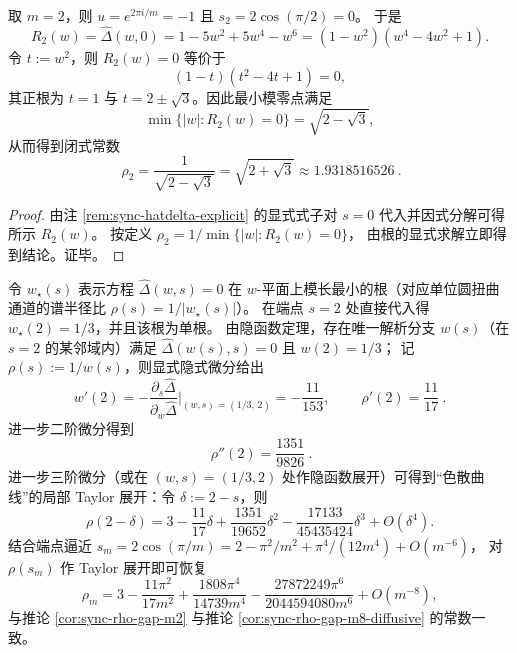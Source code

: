 \begin{corollary}[最坏扭曲 \(m=2\) 的闭式谱半径]\label{cor:sync-rho-m2-closed-form}
取 \(m=2\)，则 \(u=e^{2\pi i/m}=-1\) 且
\(
s_2=2\cos(\pi/2)=0
\)。
于是
\[
R_2(w)=\widehat\Delta(w,0)=1-5w^2+5w^4-w^6=(1-w^2)(w^4-4w^2+1).
\]
令 \(t:=w^2\)，则 \(R_2(w)=0\) 等价于
\[
(1-t)(t^2-4t+1)=0,
\]
其正根为 \(t=1\) 与 \(t=2\pm\sqrt3\)。因此最小模零点满足
\[
\min\{|w|:R_2(w)=0\}=\sqrt{2-\sqrt3},
\]
从而得到闭式常数
\[
\boxed{\ \rho_2=\frac{1}{\sqrt{2-\sqrt3}}=\sqrt{2+\sqrt3}\approx 1.9318516526\ }.
\]
\end{corollary}
\begin{proof}
由注 \ref{rem:sync-hatdelta-explicit} 的显式式子对 \(s=0\) 代入并因式分解可得所示 \(R_2(w)\)。
按定义
\(
\rho_2=1/\min\{|w|:R_2(w)=0\}
\)，
由根的显式求解立即得到结论。证毕。
\end{proof}

\begin{remark}[端点导数指纹：\texorpdfstring{$\rho'(2)=11/17$}{rho'(2)=11/17}]\label{rem:sync-rho-derivative-fingerprint}
令 \(w_\star(s)\) 表示方程 \(\widehat\Delta(w,s)=0\) 在 \(w\)-平面上模长最小的根（对应单位圆扭曲通道的谱半径比 \(\rho(s)=1/|w_\star(s)|\)）。
在端点 \(s=2\) 处直接代入得 \(w_\star(2)=1/3\)，并且该根为单根。
由隐函数定理，存在唯一解析分支 \(w(s)\)（在 \(s=2\) 的某邻域内）满足
\(\widehat\Delta(w(s),s)=0\) 且 \(w(2)=1/3\)；
记 \(\rho(s):=1/w(s)\)，则显式隐式微分给出
\[
w'(2)=-\frac{\partial_s\widehat\Delta}{\partial_w\widehat\Delta}\Big|_{(w,s)=(1/3,\,2)}=-\frac{11}{153},
\qquad
\boxed{\ \rho'(2)=\frac{11}{17}\ }.
\]
进一步二阶微分得到
\[
\boxed{\ \rho''(2)=\frac{1351}{9826}\ }.
\]
进一步三阶微分（或在 \((w,s)=(1/3,2)\) 处作隐函数展开）可得到“色散曲线”的局部 Taylor 展开：令 \(\delta:=2-s\)，则
\[
\boxed{\;
\rho(2-\delta)=3-\frac{11}{17}\delta+\frac{1351}{19652}\delta^2-\frac{17133}{45435424}\delta^3+O(\delta^4).\;}
\]
结合端点逼近
\(
s_m=2\cos(\pi/m)=2-\pi^2/m^2+\pi^4/(12m^4)+O(m^{-6})
\)，
对 \(\rho(s_m)\) 作 Taylor 展开即可恢复
\[
\rho_m
=3-\frac{11\pi^2}{17m^2}
+\frac{1808\pi^4}{14739m^4}
-\frac{27872249\pi^6}{2044594080m^6}
+O(m^{-8}),
\]
与推论 \ref{cor:sync-rho-gap-m2} 与推论 \ref{cor:sync-rho-gap-m8-diffusive} 的常数一致。
\end{remark}

